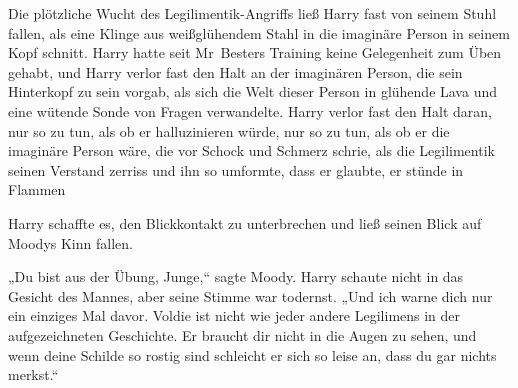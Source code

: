 Die plötzliche Wucht des Legilimentik-Angriffs ließ Harry fast von seinem Stuhl fallen, als eine Klinge aus weißglühendem Stahl in die imaginäre Person in seinem Kopf schnitt. Harry hatte seit Mr~Besters Training keine Gelegenheit zum Üben gehabt, und Harry verlor fast den Halt an der imaginären Person, die sein Hinterkopf zu sein vorgab, als sich die Welt dieser Person in glühende Lava und eine wütende Sonde von Fragen verwandelte. Harry verlor fast den Halt daran, nur so zu tun, als ob er halluzinieren würde, nur so zu tun, als ob er die imaginäre Person wäre, die vor Schock und Schmerz schrie, als die Legilimentik seinen Verstand zerriss und ihn so umformte, dass er glaubte, er stünde in Flammen

Harry schaffte es, den Blickkontakt zu unterbrechen und ließ seinen Blick auf Moodys Kinn fallen.

„Du bist aus der Übung, Junge,“ sagte Moody.
Harry schaute nicht in das Gesicht des Mannes, aber seine Stimme war todernst. „Und ich warne dich nur ein einziges Mal davor. Voldie ist nicht wie jeder andere Legilimens in der aufgezeichneten Geschichte. Er braucht dir nicht in die Augen zu sehen, und wenn deine Schilde so rostig sind schleicht er sich so leise an, dass du gar nichts merkst.“

